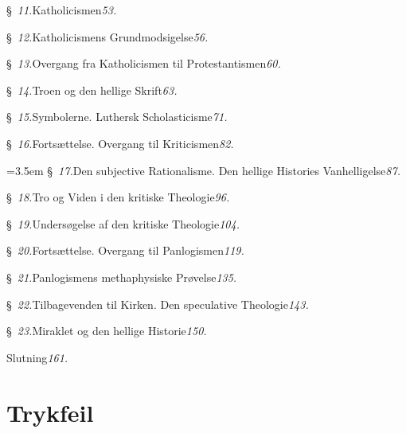 \documentclass[12pt]{book}
\begin{document}
§~\textit{11.}\quad Katholicismen\dotfill\textit{53.}\par
§~\textit{12.}\quad Katholicismens Grundmodsigelse\dotfill\textit{56.}\par
§~\textit{13.}\quad Overgang fra Katholicismen til Protestantismen\dotfill\textit{60.}\par
§~\textit{14.}\quad Troen og den hellige Skrift\dotfill\textit{63.}\par
§~\textit{15.}\quad Symbolerne. Luthersk Scholasticisme\dotfill\textit{71.}\par
§~\textit{16.}\quad Fortsættelse. Overgang til Kriticismen\dotfill\textit{82.}\par
\hangindent=3.5em
§~\textit{17.}\quad Den subjective Rationalisme. Den hellige Histories
  Vanhelligelse\dotfill\textit{87.}\par
§~\textit{18.}\quad Tro og Viden i den kritiske Theologie\dotfill\textit{96.}\par
§~\textit{19.}\quad Undersøgelse af den kritiske Theologie\dotfill\textit{104.}\par
§~\textit{20.}\quad Fortsættelse. Overgang til Panlogismen\dotfill\textit{119.}\par
§~\textit{21.}\quad Panlogismens methaphysiske Prøvelse\dotfill\textit{135.}\par
§~\textit{22.}\quad Tilbagevenden til Kirken. Den speculative Theologie\dotfill\textit{143.}\par
§~\textit{23.}\quad Miraklet og den hellige Historie\dotfill\textit{150.}\par
\hspace*{3.2em}Slutning\dotfill\textit{161.}\par

\endgroup

\chapter*{Trykfeil}
{}
\end{document}

